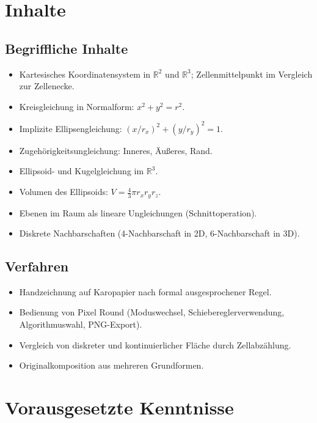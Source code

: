\documentclass[12pt,a4paper]{scrartcl}
\begin{document}
\section{Inhalte}

\subsection{Begriffliche Inhalte}
\begin{itemize}[leftmargin=1.3em,itemsep=0.15em,topsep=0.3em]
  \item Kartesisches Koordinatensystem in $\mathbb{R}^2$ und $\mathbb{R}^3$; Zellenmittelpunkt im Vergleich zur Zellenecke.
  \item Kreisgleichung in Normalform: $x^2 + y^2 = r^2$.
  \item Implizite Ellipsengleichung: $(x/r_x)^2 + (y/r_y)^2 = 1$.
  \item Zugehörigkeitsungleichung: Inneres, Äußeres, Rand.
  \item Ellipsoid- und Kugelgleichung im $\mathbb{R}^3$.
  \item Volumen des Ellipsoids: $V = \tfrac{4}{3}\pi r_x r_y r_z$.
  \item Ebenen im Raum als lineare Ungleichungen (Schnittoperation).
  \item Diskrete Nachbarschaften (4-Nachbarschaft in 2D, 6-Nachbarschaft in 3D).
\end{itemize}

\subsection{Verfahren}
\begin{itemize}[leftmargin=1.3em,itemsep=0.15em,topsep=0.3em]
  \item Handzeichnung auf Karopapier nach formal ausgesprochener Regel.
  \item Bedienung von Pixel Round (Moduswechsel, Schiebereglerverwendung, Algorithmuswahl, PNG-Export).
  \item Vergleich von diskreter und kontinuierlicher Fläche durch Zellabzählung.
  \item Originalkomposition aus mehreren Grundformen.
\end{itemize}

\section{Vorausgesetzte Kenntnisse}
\end{document}
